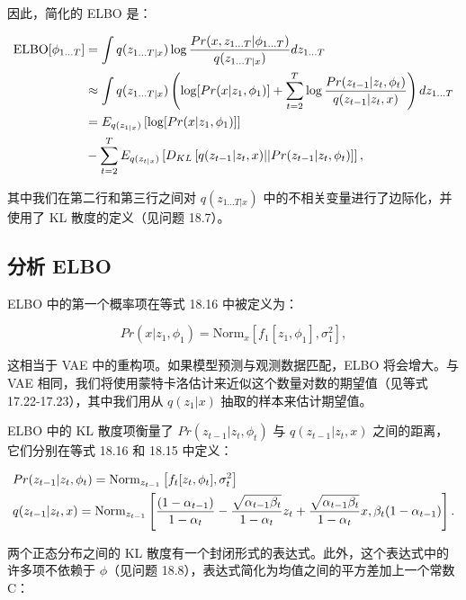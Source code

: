 \documentclass[lang=cn,newtx,10pt,scheme=chinese]{elegantbook}
\begin{document}
因此，简化的 ELBO 是：


\begin{align}
\text{ELBO}[\phi_{1...T}] &= \int q(z_{1...T|x}) \log \frac{Pr(x, z_{1...T}|\phi_{1...T})}{q(z_{1...T|x})} dz_{1...T} \notag \\
&\approx \int q(z_{1...T|x}) \left( \log [Pr(x|z_1, \phi_1)] + \sum_{t=2}^T \log \frac{Pr(z_{t-1}|z_t, \phi_t)}{q(z_{t-1}|z_t, x)} \right) dz_{1...T} \notag \\
&= E_{q(z_{1|x})} \left[ \log [Pr(x|z_1, \phi_1)] \right] \notag \\
&- \sum_{t=2}^T E_{q(z_{t|x})} \left[ D_{KL} \left[ q(z_{t-1}|z_t, x)||Pr(z_{t-1}|z_t, \phi_t) \right] \right],
\end{align}


其中我们在第二行和第三行之间对 \(q(z_{1...T|x})\) 中的不相关变量进行了边际化，并使用了 KL 散度的定义（见问题 18.7）。

\subsection{分析 ELBO}
ELBO 中的第一个概率项在等式 18.16 中被定义为：

\begin{equation}
Pr(x|z_1, \phi_1) = \text{Norm}_x \left[ f_1[z_1, \phi_1], \sigma^2_{1} \right], 
\end{equation}

这相当于 VAE 中的重构项。如果模型预测与观测数据匹配，ELBO 将会增大。与 VAE 相同，我们将使用蒙特卡洛估计来近似这个数量对数的期望值（见等式 17.22-17.23），其中我们用从 \(q(z_1|x)\) 抽取的样本来估计期望值。

ELBO 中的 KL 散度项衡量了 \(Pr(z_{t-1}|z_t, \phi_t)\) 与 \(q(z_{t-1}|z_t, x)\) 之间的距离，它们分别在等式 18.16 和 18.15 中定义：


\begin{align}
&Pr(z_{t-1}|z_t, \phi_t) = \text{Norm}_{z_{t-1}} \left[ f_t[z_t, \phi_t], \sigma^2_t \right] \notag \\
&q(z_{t-1}|z_t, x) = \text{Norm}_{z_{t-1}} \left[ \frac{(1 - \alpha_{t-1})}{1 - \alpha_t} - \frac{\sqrt{\alpha_{t-1}\beta_t}}{1 - \alpha_t} z_t + \frac{\sqrt{\alpha_{t-1}\beta_t}}{1 - \alpha_t} x, \beta_t(1 - \alpha_{t-1}) \right]. 
\end{align} 


两个正态分布之间的 KL 散度有一个封闭形式的表达式。此外，这个表达式中的许多项不依赖于 \(\phi\)（见问题 18.8），表达式简化为均值之间的平方差加上一个常数 C：
\end{document}
